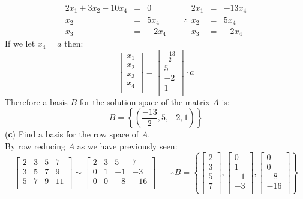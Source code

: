 \documentclass[12pt]{article}
\begin{document}
$$
\begin{aligned}
2x_1 + 3x_2 - 10x_4 &=& 0 \\
x_2 &=& 5x_4 \\
x_3 &=& -2x_4
\end{aligned}
\hspace{20pt}
\therefore
\begin{aligned}
2x_1 &=& -13x_4 \\
x_2 &=& 5x_4 \\
x_3 &=& -2x_4
\end{aligned}
$$
If we let $x_4 = a$ then:
$$
\begin{bmatrix}
   x_1 \\
   x_2 \\
   x_3 \\
   x_4 \\
\end{bmatrix}
=
\begin{bmatrix}
   \frac{-13}{2} \\
   5 \\
   -2 \\
   1 \\
\end{bmatrix}\cdot a
$$
Therefore a basis $B$ for the solution space of the matrix $A$ is:
$$
B = 
\left\{
\left(
\frac{-13}{2}, 5, -2, 1
\right)
\right\}
$$
\medskip
(\textbf{c}) Find a basis for the row space of $A$.\\
By row reducing $A$ as we have previously seen:
$$
\begin{bmatrix}
   2 & 3 & 5 & 7 \\
   3 & 5 & 7 & 9 \\
   5 & 7 & 9 & 11 \\
\end{bmatrix}
\sim
\begin{bmatrix}
   2 & 3 & 5 & 7 \\
   0 & 1 & -1 & -3 \\
   0 & 0 & -8 & -16 \\
\end{bmatrix}
\hspace{20pt}
\therefore
B = 
\left\{
\begin{bmatrix}
   2 \\
   3 \\
   5 \\
   7 \\
\end{bmatrix}
,
\begin{bmatrix}
   0 \\
   1 \\
   -1 \\
   -3 \\
\end{bmatrix}
,
\begin{bmatrix}
   0 \\
   0 \\
   -8 \\
   -16 \\
\end{bmatrix}
\right\}
$$
\end{document}
